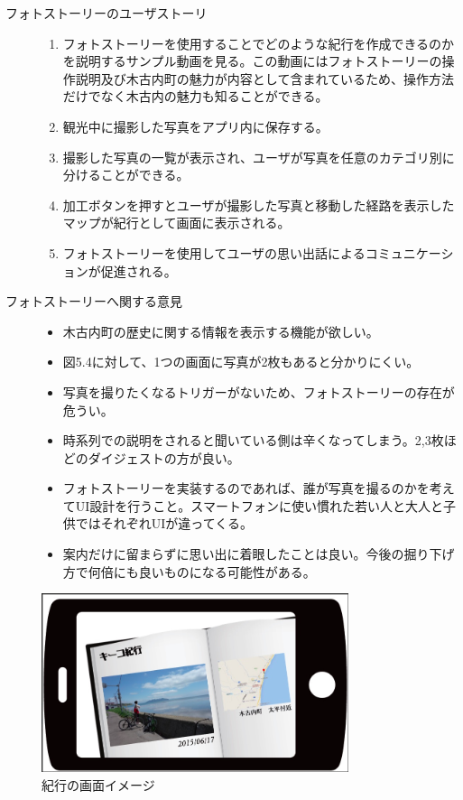 \begin{description}
 \item[フォトストーリーのユーザストーリ]\mbox{}
 \begin{enumerate}
 \item フォトストーリーを使用することでどのような紀行を作成できるのかを説明するサンプル動画を見る。この動画にはフォトストーリーの操作説明及び木古内町の魅力が内容として含まれているため、操作方法だけでなく木古内の魅力も知ることができる。
  \item 観光中に撮影した写真をアプリ内に保存する。
 \item 撮影した写真の一覧が表示され、ユーザが写真を任意のカテゴリ別に分けることができる。
 \item 加工ボタンを押すとユーザが撮影した写真と移動した経路を表示したマップが紀行として画面に表示される。
 \item フォトストーリーを使用してユーザの思い出話によるコミュニケーションが促進される。
\end{enumerate}
\item[フォトストーリーへ関する意見]\mbox{}
 \begin{itemize}
 \item 木古内町の歴史に関する情報を表示する機能が欲しい。
 \item 図5.4に対して、1つの画面に写真が2枚もあると分かりにくい。
 \item 写真を撮りたくなるトリガーがないため、フォトストーリーの存在が危うい。
 \item 時系列での説明をされると聞いている側は辛くなってしまう。2,3枚ほどのダイジェストの方が良い。
 \item フォトストーリーを実装するのであれば、誰が写真を撮るのかを考えてUI設計を行うこと。スマートフォンに使い慣れた若い人と大人と子供ではそれぞれUIが違ってくる。
 \item 案内だけに留まらずに思い出に着眼したことは良い。今後の掘り下げ方で何倍にも良いものになる可能性がある。
 \end{itemize}
\end{description}

\begin{figure}[htbp]
 \begin{center}
\includegraphics[width=9cm, bb=0 0 857 498]{5.1_kikou.png}
 \end{center}
\addtocounter{figure}{+0}
 \caption{紀行の画面イメージ}
 \label{fig:one}
\end{figure}
